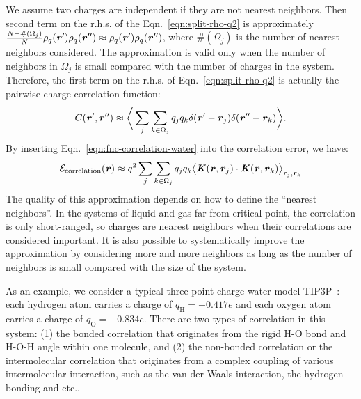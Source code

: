 \documentclass[aps,pre,preprint,unsortedaddress]{revtex4}
\newcommand{\recheck}[1]{{\color{red} #1}}
\newcommand{\redc}[1]{{\color{red} #1}}
\renewcommand{\v}[1]{\textbf{\textit{#1}}}
\begin{document}
We assume two charges are independent if they are not nearest neighbors.
Then
second \redc{term} on the r.h.s. of the Eqn.~\eqref{eqn:split-rho-q2} is
approximately $\frac{N-\#(\Omega_j)}{N}\rho_q(\v r')\rho_q(\v r'')\approx
\rho_q(\v r')\rho_q(\v r'')$,
where $\#(\Omega_j)$ is the number of nearest neighbors considered.
The approximation is valid only when the number
of neighbors in $\Omega_j$ is small \redc{compared} with the number of charges
in the system.
Therefore, the first \redc{term}
on the r.h.s. of Eqn.~\eqref{eqn:split-rho-q2} is actually the
pairwise charge correlation function:
\begin{align}\label{eqn:fnc-correlation-water}
  C(\v r', \v r'') \approx
  \bigg\langle
  \sum_j\sum_{k\in\Omega_j}q_jq_k\delta(\v r' - \v r_j)\delta(\v r'' - \v r_k)
  \bigg\rangle.
\end{align}
By inserting Eqn.~\eqref{eqn:fnc-correlation-water} into
the correlation error, we have:
\begin{align}
  \mathcal E_{\textrm{correlation}}(\v r)
  \approx q^2\sum_j\sum_{k\in\Omega_j}q_jq_k
  \big\langle
  \v K(\v r , \v r_j)\cdot\v K(\v r , \v r_k)
  \big\rangle_{\v r_j,\v r_k}
\end{align}
The quality of this approximation depends on how to define the
``nearest neighbors''. In the systems
of liquid and gas far from critical point,
the correlation is only short-ranged, so charges are nearest neighbors when
their correlations are considered important.
It is also possible to systematically
improve the approximation by considering more and more neighbors as long as
the number of neighbors is small \redc{compared} with the size of the system.


As an example, we consider a typical three point charge water model
TIP3P~\cite{jorgensen1983comparison}: each hydrogen atom carries a
charge of $q_{\textrm{H}} = +0.417e$ and each oxygen atom carries a
charge of $q_{\textrm{O}} = -0.834e$.  \recheck{ There are two types
  of correlation in this system: (1) the bonded correlation
  that originates from the rigid H-O
  bond and H-O-H angle within one molecule,
  and (2) the
  non-bonded correlation or the
  intermolecular correlation that originates from
  a complex coupling of various intermolecular interaction, such as
  the van der Waals interaction,
  the hydrogen bonding and etc..
}
\end{document}
